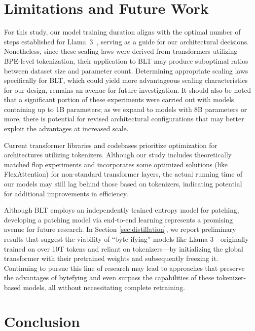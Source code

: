 \section{Limitations and Future Work}

For this study, our model training duration aligns with the optimal number of steps established for Llama~3~\citep{dubey2024llama}, serving as a guide for our architectural decisions. Nonetheless, since these scaling laws were derived from transformers utilizing BPE-level tokenization, their application to {\textsc BLT} may produce suboptimal ratios between dataset size and parameter count. Determining appropriate scaling laws specifically for {\textsc BLT}, which could yield more advantageous scaling characteristics for our design, remains an avenue for future investigation. It should also be noted that a significant portion of these experiments were carried out with models containing up to 1B parameters; as we expand to models with 8B parameters or more, there is potential for revised architectural configurations that may better exploit the advantages at increased scale.

Current transformer libraries and codebases prioritize optimization for architectures utilizing tokenizers. Although our study includes theoretically matched flop experiments and incorporates some optimized solutions (like FlexAttention) for non-standard transformer layers, the actual running time of our models may still lag behind those based on tokenizers, indicating potential for additional improvements in efficiency.

Although {\textsc BLT} employs an independently trained entropy model for patching, developing a patching model via end-to-end learning represents a promising avenue for future research. In Section \ref{sec:distillation}, we report preliminary results that suggest the viability of ``byte-ifying'' models like Llama 3—originally trained on over 10T tokens and reliant on tokenizers—by initializing the global transformer with their pretrained weights and subsequently freezing it. Continuing to pursue this line of research may lead to approaches that preserve the advantages of bytefying and even surpass the capabilities of these tokenizer-based models, all without necessitating complete retraining.

\section{Conclusion}
\label{section:conclusion}

